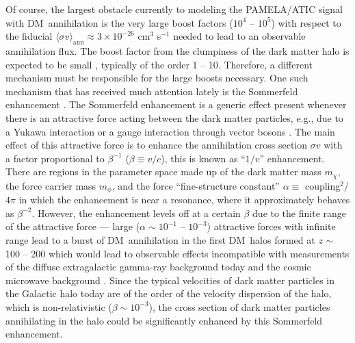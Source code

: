 \documentclass[aps,prd,twocolumn,amsmath,amssymb,floatfix,nofootinbib,10pt]{revtex4}
\newcommand{\eg}{e.g.}
\newcommand{\DM}{DM}
\newcommand{\mdm}{\ensuremath{m_{\chi}}}
\newcommand{\mv}{\ensuremath{m_{\phi}}}
\begin{document}
Of course, the largest obstacle currently to modeling the PAMELA/ATIC
signal with \DM\ annihilation is the very large boost factors ($10^4$
-- $10^5$) with respect to the fiducial $\langle \sigma v
\rangle_{\mathrm{ann}} \approx 3 \times 10^{-26} $ cm$^3$ s$^{-1}$
needed to lead to an observable annihilation flux. The boost factor
from the clumpiness of the dark matter halo is expected to be small
\cite{2008A&A...479..427L,2008Natur.454..735D,2008ApJ...686..262K,2008Natur.456...73S},
typically of the order 1 -- 10. Therefore, a different mechanism must
be responsible for the large boosts necessary. One such mechanism that
has received much attention lately is the Sommerfeld enhancement
\cite{sommerfeld31a,2003PhRvD..67g5014H,2004PhRvL..92c1303H,2005PhRvD..71f3528H,2005PhRvD..71a5007H,2006PhRvD..73e5004H,2008NuPhB.800..204C,2008JHEP...07..058M,2008arXiv0812.0559M,2008arXiv0812.0360L}. The
Sommerfeld enhancement is a generic effect present whenever there is
an attractive force acting between the dark matter particles, \eg, due
to a Yukawa interaction or a gauge interaction through vector bosons
\cite{ArkaniHamed:2008qn}. The main effect of this attractive force is
to enhance the annihilation cross section $\sigma v$ with a factor
proportional to $\beta^{-1}$ ($\beta \equiv v/c$), this is known as
``$1/v$'' enhancement. There are regions in the parameter space made
up of the dark matter mass \mdm, the force carrier mass \mv, and the
force ``fine-structure constant'' $\alpha \equiv$ coupling$^2$/$4 \pi$
in which the enhancement is near a resonance, where it approximately
behaves as $\beta^{-2}$. However, the enhancement levels off at a
certain $\beta$ due to the finite range of the attractive force ---
large ($\alpha \sim\!10^{-1}$ -- $10^{-3}$) attractive forces with
infinite range lead to a burst of \DM\ annihilation in the first \DM\
halos formed at $z$ $\sim$ 100 -- 200 which would lead to observable
effects incompatible with measurements of the diffuse extragalactic
gamma-ray background today and the cosmic microwave background
\cite{2008arXiv0810.3233K}. Since the typical velocities of dark
matter particles in the Galactic halo today are of the order of the
velocity dispersion of the halo, which is non-relativistic ($\beta\sim
10^{-3}$), the cross section of dark matter particles annihilating in
the halo could be significantly enhanced by this Sommerfeld
enhancement.
\end{document}
